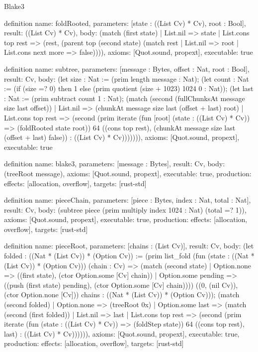\begin{lexlean}{Blake3}
\begin{semanticmodule}
definition{
  name: foldRooted,
  parameters: [state : ((List Cv) * Cv), root : Bool],
  result: ((List Cv) * Cv),
  body: (match (first state)
    | List.nil => state
    | List.cons top rest => (rest, (parent top (second state) (match rest
      | List.nil => root
      | List.cons next more => false)))),
  axioms: [Quot.sound, propext],
  executable: true
}

definition{
  name: subtree,
  parameters: [message : Bytes, offset : Nat, root : Bool],
  result: Cv,
  body: (let size : Nat := (prim length message : Nat); (let count : Nat := (if (size =? 0) then 1 else (prim quotient (size + 1023) 1024 0 : Nat)); (let last : Nat := (prim subtract count 1 : Nat); (match (second (fullChunksAt message size last offset))
    | List.nil => (chunkAt message size last (offset + last) root)
    | List.cons top rest => (second (prim iterate (fun [root] (state : ((List Cv) * Cv)) => (foldRooted state root)) 64 ((cons top rest), (chunkAt message size last (offset + last) false)) : ((List Cv) * Cv))))))),
  axioms: [Quot.sound, propext],
  executable: true
}

definition{
  name: blake3,
  parameters: [message : Bytes],
  result: Cv,
  body: (treeRoot message),
  axioms: [Quot.sound, propext],
  executable: true,
  production: {effects: [allocation, overflow], targets: [rust-std]}
}

definition{
  name: pieceChain,
  parameters: [piece : Bytes, index : Nat, total : Nat],
  result: Cv,
  body: (subtree piece (prim multiply index 1024 : Nat) (total =? 1)),
  axioms: [Quot.sound, propext],
  executable: true,
  production: {effects: [allocation, overflow], targets: [rust-std]}
}

definition{
  name: pieceRoot,
  parameters: [chains : (List Cv)],
  result: Cv,
  body: (let folded : ((Nat * (List Cv)) * (Option Cv)) := (prim list_fold (fun (state : ((Nat * (List Cv)) * (Option Cv))) (chain : Cv) => (match (second state)
    | Option.none => ((first state), (ctor Option.some [Cv] chain))
    | Option.some pending => ((push (first state) pending), (ctor Option.some [Cv] chain)))) ((0, (nil Cv)), (ctor Option.none [Cv])) chains : ((Nat * (List Cv)) * (Option Cv))); (match (second folded)
    | Option.none => (treeRoot 0x)
    | Option.some last => (match (second (first folded))
      | List.nil => last
      | List.cons top rest => (second (prim iterate (fun (state : ((List Cv) * Cv)) => (foldStep state)) 64 ((cons top rest), last) : ((List Cv) * Cv)))))),
  axioms: [Quot.sound, propext],
  executable: true,
  production: {effects: [allocation, overflow], targets: [rust-std]}
}


\end{semanticmodule}
\end{lexlean}

